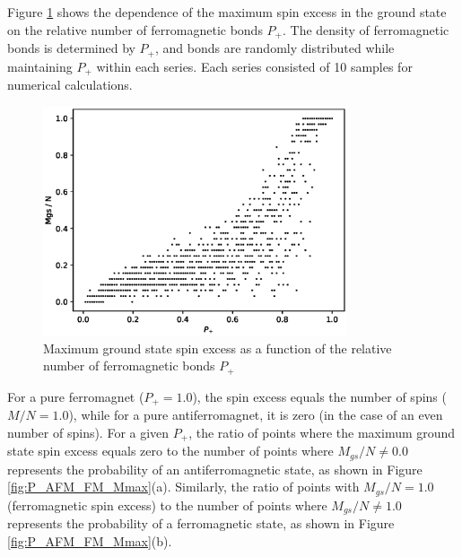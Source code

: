 \documentclass[utf8, babel, sor, jor, amsmath, amssymb, reprint]{elsarticle} %
\begin{document}
Figure \ref{fig:Mgs(P+)} shows the dependence of the maximum spin excess in the ground state on the relative number of ferromagnetic bonds $P_+$. The density of ferromagnetic bonds is determined by $P_+$, and bonds are randomly distributed while maintaining $P_+$ within each series. Each series consisted of 10 samples for numerical calculations.

\begin{figure}[H]
	\centering
	\includegraphics[width=0.8\textwidth]{images/Mgs(P+).eps}
	\caption{Maximum ground state spin excess as a function of the relative number of ferromagnetic bonds $P_+$}
	\label{fig:Mgs(P+)}
\end{figure}

For a pure ferromagnet ($P_+ = 1.0$), the spin excess equals the number of spins ($M/N = 1.0$), while for a pure antiferromagnet, it is zero (in the case of an even number of spins). For a given $P_+$, the ratio of points where the maximum ground state spin excess equals zero to the number of points where $M_{gs}/N \neq 0.0$ represents the probability of an antiferromagnetic state, as shown in Figure \ref{fig:P_AFM_FM_Mmax}(a). Similarly, the ratio of points with $M_{gs}/N = 1.0$ (ferromagnetic spin excess) to the number of points where $M_{gs}/N \neq 1.0$ represents the probability of a ferromagnetic state, as shown in Figure \ref{fig:P_AFM_FM_Mmax}(b).
\end{document}
